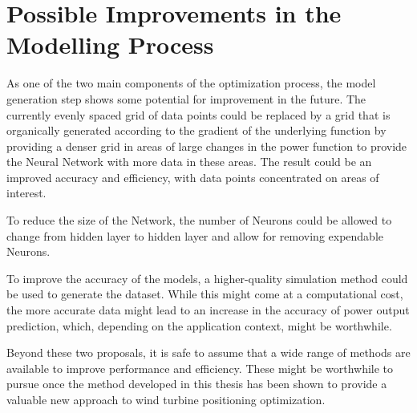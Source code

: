 \section{Possible Improvements in the Modelling Process}

As one of the two main components of the optimization process, the model generation step shows some potential for improvement in the future. The currently evenly spaced grid of data points could be replaced by a grid that is organically generated according to the gradient of the underlying function by providing a denser grid in areas of large changes in the power function to provide the Neural Network with more data in these areas. The result could be an improved accuracy and efficiency, with data points concentrated on areas of interest.   

To reduce the size of the Network, the number of Neurons could be allowed to change from hidden layer to hidden layer and allow for removing expendable Neurons. 

To improve the accuracy of the models, a higher-quality simulation method could be used to generate the dataset. While this might come at a computational cost, the more accurate data might lead to an increase in the  accuracy of power output prediction, which, depending on the application context, might be worthwhile.  

Beyond these two proposals, it is safe to assume that a wide range of methods are available to improve performance and efficiency. These might be worthwhile to pursue once the method developed in this thesis has been shown to provide a valuable new approach to wind turbine positioning optimization.
